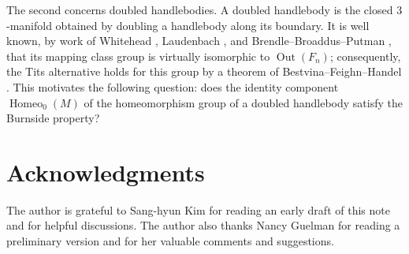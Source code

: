 \documentclass[12pt,a4paper]{amsart}
\numberwithin{equation}{section}
\theoremstyle{plain}
\theoremstyle{definition}
\theoremstyle{remark}
\begin{document}
The second concerns doubled handlebodies.
A doubled handlebody is the closed $3$-manifold obtained by doubling a handlebody along its boundary.
It is well known, by work of Whitehead \cite{MR1575455}, Laudenbach \cite{MR356056}, and Brendle--Broaddus--Putman \cite{MR4557874}, that its mapping class group is virtually isomorphic to $\operatorname{Out}(F_n)$; consequently, the Tits alternative holds for this group by a theorem of Bestvina--Feighn--Handel \cite{MR1765705, MR2150382}.
This motivates the following question: does the identity component $\operatorname{Homeo}_0(M)$ of the homeomorphism group of a doubled handlebody satisfy the Burnside property?

\section*{Acknowledgments}

The author is grateful to Sang-hyun Kim for reading an early draft of this note
and for helpful discussions. The author also thanks Nancy Guelman for reading
a preliminary version and for her valuable comments and suggestions.





\end{document}

